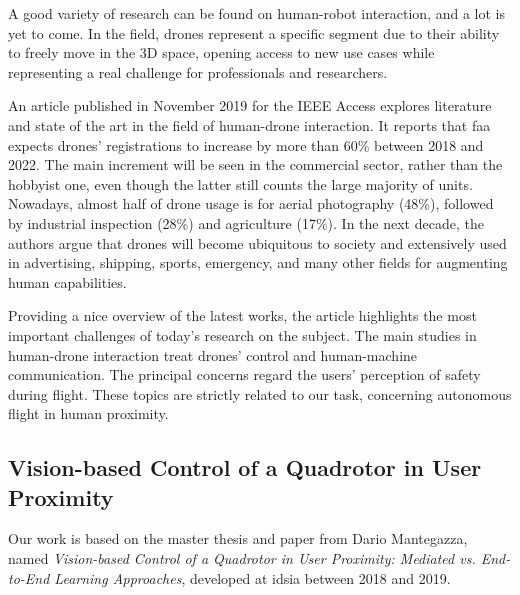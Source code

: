 A good variety of research can be found on human-robot interaction, and a lot is yet to come. In the field, drones represent a specific segment due to their ability to freely move in the 3D space, opening access to new use cases while representing a real challenge for professionals and researchers.

An article published in November 2019 for the IEEE Access \cite{human-drone-sota} explores literature and state of the art in the field of human-drone interaction. It reports that \gls{faa} expects drones' registrations to increase by more than 60\% between 2018 and 2022. The main increment will be seen in the commercial sector, rather than the hobbyist one, even though the latter still counts the large majority of units. Nowadays, almost half of drone usage is for aerial photography (48\%), followed by industrial inspection (28\%) and agriculture (17\%). In the next decade, the authors argue that drones will become ubiquitous to society and extensively used in advertising, shipping, sports, emergency, and many other fields for augmenting human capabilities.

Providing a nice overview of the latest works, the article highlights the most important challenges of today's research on the subject. The main studies in human-drone interaction treat drones' control and human-machine communication. The principal concerns regard the users' perception of safety during flight. These topics are strictly related to our task, concerning autonomous flight in human proximity.



\subsection{Vision-based Control of a Quadrotor in User Proximity}
\label{subsec:sota-dario}

Our work is based on the master thesis \cite{mantegazza2018thesis} and paper \cite{mantegazza2019visionbased} from Dario Mantegazza, named \textit{Vision-based Control of a Quadrotor in User Proximity: Mediated vs. End-to-End Learning Approaches}, developed at \gls{idsia} between 2018 and 2019.

\medskip

